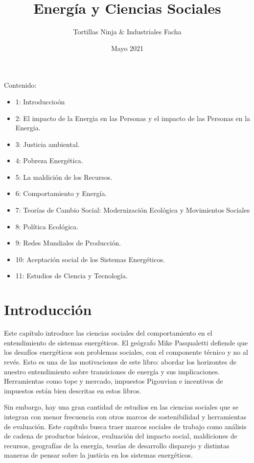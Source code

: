 \documentclass{article}
\title{\textbf{Energía y Ciencias Sociales}}
\author{Tortillas Ninja & Industriales Facha}
\date{Mayo 2021}
\begin{document}
\maketitle

Contenido: 
\begin{itemize}
\item 1: Introduccioón
\item2: El impacto de la Energia en las Personas y el impacto de las Personas en la Energia. 
\item3: Justicia ambiental.
\item4: Pobreza Energética. 
\item5: La maldición de los Recursos. 
\item6: Comportamiento y Energía.
\item7: Teorías de Cambio Social: Modernización Ecológica y Movimientos Sociales
\item8: Política Ecológica. 
\item9: Redes Mundiales de Producción.
\item10: Aceptación social de los Sistemas Energéticos. 
\item11: Estudios de Ciencia y Tecnología.
\end{itemize}





\section{Introducción}
Este capítulo introduce las ciencias sociales del comportamiento en el entendimiento de sistemas energéticos. El geógrafo Mike Pasqualetti defiende que los desafíos energéticos son problemas sociales, con el componente técnico y no al revés. Esto es una de las motivaciones de este libro: abordar los horizontes de nuestro entendimiento sobre transiciones de energía y sus implicaciones. Herramientas como tope y mercado, impuestos Pigouvian e incentivos de impuestos están bien descritas en estos libros. 

Sin embargo, hay una gran cantidad de estudios en las ciencias sociales que se integran con menor frecuencia con otros marcos de sostenibilidad y herramientas de evaluación. Este capítulo busca traer marcos sociales de trabajo como análisis de cadena de productos básicos, evaluación del impacto social, maldiciones de recursos, geografías de la energía, teorías de desarrollo disparejo y distintas maneras de pensar sobre la justicia en los sistemas energéticos. 
\end{document}
